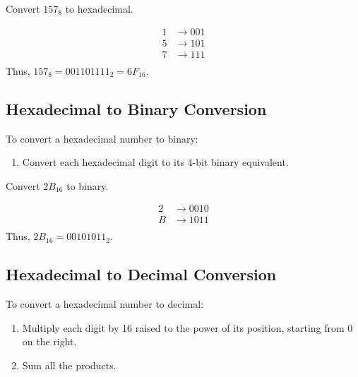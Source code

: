 \begin{example}Convert \(157_8\) to hexadecimal.

\begin{solution}

\[
\begin{aligned}
1 & \rightarrow 001 \\
5 & \rightarrow 101 \\
7 & \rightarrow 111 \\
\end{aligned}
\]
Thus, \(157_8 = 001101111_2 = 6F_{16}\). \end{solution}
\end{example}

\subsection*{Hexadecimal to Binary Conversion}
To convert a hexadecimal number to binary:
\begin{enumerate}
    \item Convert each hexadecimal digit to its 4-bit binary equivalent.
\end{enumerate}

\begin{example}Convert \(2B_{16}\) to binary.

\begin{solution}
    


\[
\begin{aligned}
2 & \rightarrow 0010 \\
B & \rightarrow 1011 \\
\end{aligned}
\]
Thus, \(2B_{16} = 00101011_2\).\end{solution}

\end{example}

\subsection*{Hexadecimal to Decimal Conversion}
To convert a hexadecimal number to decimal:
\begin{enumerate}
    \item Multiply each digit by 16 raised to the power of its position, starting from 0 on the right.
    \item Sum all the products.
\end{enumerate}

